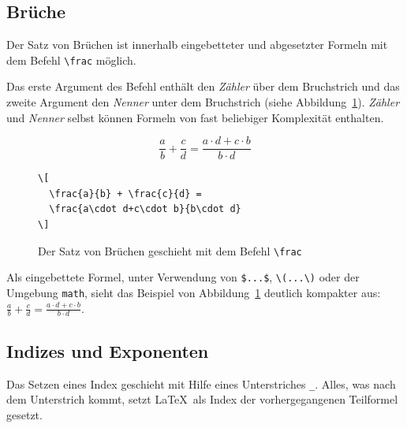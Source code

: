 \documentclass[a4paper,10pt,twoside]{scrbook}
\begin{document}
\subsection{Brüche}

Der Satz von Brüchen ist innerhalb eingebetteter und abgesetzter Formeln mit dem Befehl \verb!\frac! möglich. 



Das erste Argument des Befehl enthält den \textsl{Zähler} über dem Bruchstrich und das zweite Argument den \textsl{Nenner} unter dem Bruchstrich (siehe Abbildung~\ref{Beispiel_frac1}). \textsl{Zähler} und
\textsl{Nenner} selbst können Formeln von fast beliebiger Komplexität enthalten.

\begin{figure}[H]
\begin{minipage}[c]{.4\textwidth}
\setlength{\parskip}{1em}
\[
  \frac{a}{b} + \frac{c}{d} = 
  \frac{a\cdot d+c\cdot b}{b\cdot d}
\]
\end{minipage}
\hfill
\begin{minipage}{.58\textwidth}
\setlength{\parskip}{1em}
\begin{lstlisting}[label=fracbeispiel, style=customlatex]
\[
  \frac{a}{b} + \frac{c}{d} = 
  \frac{a\cdot d+c\cdot b}{b\cdot d}
\]
\end{lstlisting}
\end{minipage}
\caption{Der Satz von Brüchen geschieht mit dem Befehl \texttt{\textbackslash frac}}
\label{Beispiel_frac1}
\end{figure}

Als eingebettete Formel, unter Verwendung von \verb!$...$!, \verb!\(...\)! oder der Umgebung \verb!math!,  sieht das Beispiel von Abbildung~\ref{Beispiel_frac1} deutlich kompakter aus: \(\frac{a}{b} + \frac{c}{d} = \frac{a\cdot d+c\cdot b}{b\cdot d}\).

\subsection{Indizes und Exponenten}

Das Setzen eines Index geschieht 
mit Hilfe eines Unterstriches 
\verb!_!. Alles, was nach
dem Unterstrich kommt, setzt \LaTeX\ als Index 
der vorhergegangenen Teilformel gesetzt. 
\end{document}
